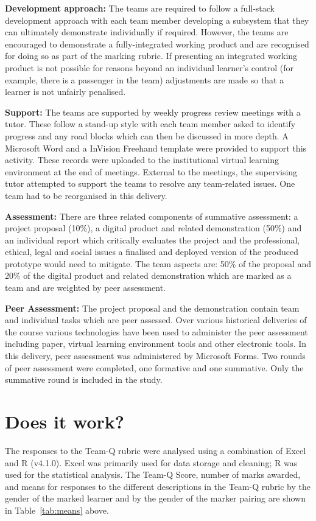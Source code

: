 \documentclass[sigconf, anonymous=false]{acmart}
\begin{document}
\textbf{Development approach:}
The teams are required to follow a full-stack development approach
with each team member developing a subsystem that they can ultimately
demonstrate individually if required. However, the teams are
encouraged to demonstrate a fully-integrated working product and are
recognised for doing so as part of the marking rubric. If presenting
an integrated working product is not possible for reasons beyond an
individual learner's control (for example, there is a passenger in the
team) adjustments are made so that a learner is not unfairly
penalised.

\textbf{Support:}
The teams are supported by weekly progress review meetings with a
tutor. These follow a stand-up style with each team member asked to
identify progress and any road blocks which can then be discussed in
more depth. A Microsoft Word and a InVision Freehand
template were provided to support this activity. These records were
uploaded to the institutional virtual learning environment at the end of
meetings. External to the meetings, the supervising tutor attempted to
support the teams to resolve any team-related issues. One team had to be reorganised in this delivery. 

\textbf{Assessment:}
There are three related components of summative assessment: a project
proposal (10\%), a digital product and related demonstration (50\%) and an individual report which critically evaluates the project and the professional, ethical, legal and social issues a finalised and deployed version of the
produced prototype would need to mitigate. The team aspects are: 50\%
of the proposal and 20\% of the digital product and related demonstration which are marked as a team and are weighted by peer assessment.

\textbf{Peer Assessment:}
The project proposal and the demonstration contain team and individual
tasks which are peer assessed. Over various historical deliveries of the
course various technologies have been used to administer the peer
assessment including paper, virtual learning environment tools and
other electronic tools. In this delivery, peer assessment was
administered by Microsoft Forms. Two rounds of peer assessment were
completed, one formative and one summative. Only the summative round
is included in the study.

\section{Does it work?}	
The responses to the Team-Q rubric were analysed using a combination
of Excel and R (v4.1.0). Excel was primarily used for data storage
and cleaning; R was used for the statistical analysis. The Team-Q Score, number of marks awarded, and means for responses to
the different descriptions in the Team-Q rubric by the gender of the
marked learner and by the gender of the marker pairing are shown in
Table~\ref{tab:means} above. 
\end{document}
